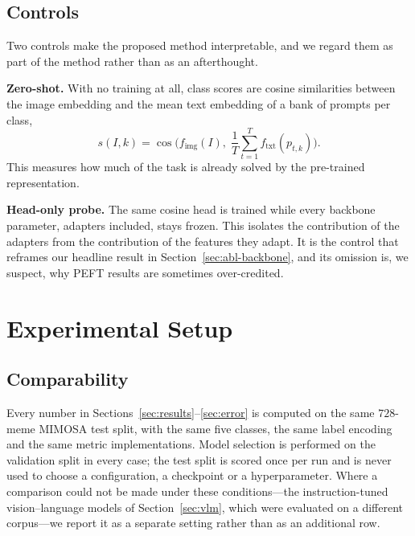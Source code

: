 \documentclass[conference]{IEEEtran}
\begin{document}
\subsection{Controls}
\label{sec:method-controls}

Two controls make the proposed method interpretable, and we regard them as part
of the method rather than as an afterthought.

\textbf{Zero-shot.} With no training at all, class scores are cosine
similarities between the image embedding and the mean text embedding of a bank
of prompts per class,
\begin{equation}
s(I, k) = \cos\!\big(f_{\text{img}}(I),\; \textstyle\frac{1}{T}\sum_{t=1}^{T} f_{\text{txt}}(p_{t,k})\big).
\label{eq:zeroshot}
\end{equation}
This measures how much of the task is already solved by the pre-trained
representation.

\textbf{Head-only probe.} The same cosine head is trained while every backbone
parameter, adapters included, stays frozen. This isolates the contribution of
the adapters from the contribution of the features they adapt. It is the control
that reframes our headline result in Section~\ref{sec:abl-backbone}, and its
omission is, we suspect, why PEFT results are sometimes over-credited.

\section{Experimental Setup}
\label{sec:setup}

\subsection{Comparability}

Every number in Sections~\ref{sec:results}--\ref{sec:error} is computed on the
same $728$-meme MIMOSA test split, with the same five classes, the same label
encoding and the same metric implementations. Model selection is performed on
the validation split in every case; the test split is scored once per run and is
never used to choose a configuration, a checkpoint or a hyperparameter. Where a
comparison could not be made under these conditions---the instruction-tuned
vision--language models of Section~\ref{sec:vlm}, which were evaluated on a
different corpus---we report it as a separate setting rather than as an
additional row.
\end{document}
